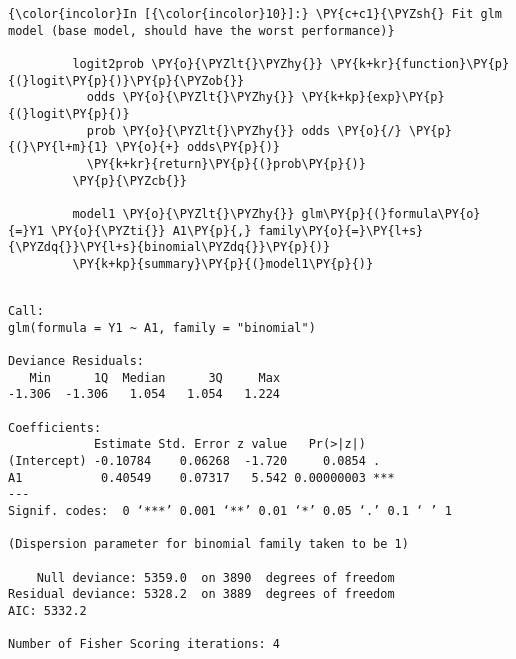  \begin{Verbatim}[commandchars=\\\{\}]
{\color{incolor}In [{\color{incolor}10}]:} \PY{c+c1}{\PYZsh{} Fit glm model (base model, should have the worst performance)}
         
         logit2prob \PY{o}{\PYZlt{}\PYZhy{}} \PY{k+kr}{function}\PY{p}{(}logit\PY{p}{)}\PY{p}{\PYZob{}}
           odds \PY{o}{\PYZlt{}\PYZhy{}} \PY{k+kp}{exp}\PY{p}{(}logit\PY{p}{)}
           prob \PY{o}{\PYZlt{}\PYZhy{}} odds \PY{o}{/} \PY{p}{(}\PY{l+m}{1} \PY{o}{+} odds\PY{p}{)}
           \PY{k+kr}{return}\PY{p}{(}prob\PY{p}{)}
         \PY{p}{\PYZcb{}}
         
         model1 \PY{o}{\PYZlt{}\PYZhy{}} glm\PY{p}{(}formula\PY{o}{=}Y1 \PY{o}{\PYZti{}} A1\PY{p}{,} family\PY{o}{=}\PY{l+s}{\PYZdq{}}\PY{l+s}{binomial\PYZdq{}}\PY{p}{)}
         \PY{k+kp}{summary}\PY{p}{(}model1\PY{p}{)}
\end{Verbatim}


    
    \begin{verbatim}

Call:
glm(formula = Y1 ~ A1, family = "binomial")

Deviance Residuals: 
   Min      1Q  Median      3Q     Max  
-1.306  -1.306   1.054   1.054   1.224  

Coefficients:
            Estimate Std. Error z value   Pr(>|z|)    
(Intercept) -0.10784    0.06268  -1.720     0.0854 .  
A1           0.40549    0.07317   5.542 0.00000003 ***
---
Signif. codes:  0 ‘***’ 0.001 ‘**’ 0.01 ‘*’ 0.05 ‘.’ 0.1 ‘ ’ 1

(Dispersion parameter for binomial family taken to be 1)

    Null deviance: 5359.0  on 3890  degrees of freedom
Residual deviance: 5328.2  on 3889  degrees of freedom
AIC: 5332.2

Number of Fisher Scoring iterations: 4

    \end{verbatim}

   
